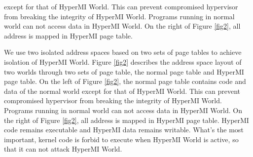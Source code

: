 \iffalse
except for that of HyperMI World. This can prevent compromised hypervisor from breaking the integrity of HyperMI World. Programs running in normal world can not access data in HyperMI World. On the right of Figure \ref{fig2}, all address is mapped in HyperMI page table.

 We use two isolated address spaces based on two sets of page tables to achieve isolation of HyperMI World.
Figure \ref{fig2} describes the address space layout of two worlds through two sets of page table, the normal page table and HyperMI page table. On the left of Figure \ref{fig2}, the normal page table contains code and data of the normal world except for that of HyperMI World. This can prevent compromised hypervisor from breaking the integrity of HyperMI World. Programs running in normal world can not access data in HyperMI World. On the right of Figure \ref{fig2}, all address is mapped in HyperMI page table.
HyperMI code remains executable and HyperMI data remains writable. What's the most important, kernel code is forbid to execute when HyperMI World is active, so that it can not attack HyperMI World.

